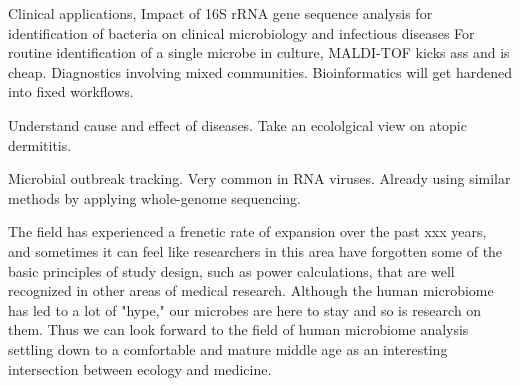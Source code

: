 \documentclass{amsart}
\newcommand{\forarxiv}[1]{#1}
\newcommand{\notforarxiv}[1]{}
\newcommand{\FIGmassTransport}{\
\begin{figure}[ht]
\begin{center}
  \forarxiv{\texttt{[image: mass\_transport.pdf]}}
\end{center}
\caption{\
  Caption goes here.
}
\label{FIGmassTransport}
\end{figure}
}
\begin{document}
Clinical applications,
\cite{clarridge2004}
{{I}mpact of 16{S} r{RNA} gene sequence analysis for identification of bacteria on clinical microbiology and infectious diseases}
For routine identification of a single microbe in culture, MALDI-TOF kicks ass and is cheap.
Diagnostics involving mixed communities.
Bioinformatics will get hardened into fixed workflows.

Understand cause and effect of diseases.
Take an ecololgical view on atopic dermititis.

Microbial outbreak tracking.
Very common in RNA viruses.
Already using similar methods by applying whole-genome sequencing.

The field has experienced a frenetic rate of expansion over the past xxx years, and sometimes it can feel like researchers in this area have forgotten some of the basic principles of study design, such as power calculations, that are well recognized in other areas of medical research.
Although the human microbiome has led to a lot of "hype," our microbes are here to stay and so is research on them.
Thus we can look forward to the field of human microbiome analysis settling down to a comfortable and mature middle age as an interesting intersection between ecology and medicine.


\notforarxiv{
\newpage
\section{Figure Legends}
\clearpage

\newpage
}



\end{document}

